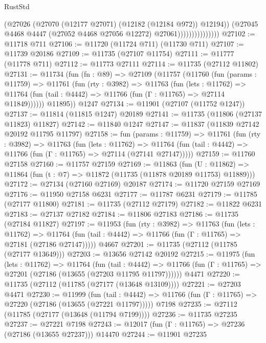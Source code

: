 \begin{lexlean}{RustStd}
\begin{coremodule}
                                (@27026 (@27070 (@12177 @27071) (@12182 (@12184 @972)) @12194))
                                (@27045
                                  @4468
                                  @4447
                                  (@27052 @4468 @27056 @12272)
                                  @27061)))))))))))))))
@27102 := @11718 @711
@27106 := @11720 (@11724 @711) (@11730 @711)
@27107 := @11739 @20186
@27109 := @11735 (@27107 @11754)
@27111 := @11777 (@11778 @711)
@27112 := @11773 @27111
@27114 := @11735 (@27112 @11802)
@27131 := @11734
    (fun (fn : @89) =>
    @27109
      (@11757
        (@11760
          (fun (params : @11759) =>
          @11761
            (fun (rty : @3982) =>
            @11763
              (fun (lets : @11762) =>
              @11764 (fun (tail : @4442) => @11766 (fun (Γ : @11765) => @27114 @11849))))))
        @11895))
    @1247
@27134 := @11901 (@27107 (@11752 @1247))
@27137 := @11814 (@11815 @1247) @20189
@27141 := @11735 (@11806 (@27137 @11823) @11827)
@27142 := @11840 @1247
@27147 := @11837 (@11839 @27142 @20192 @11795 @11797)
@27158 := fun (params : @11759) =>
  @11761
    (fun (rty : @3982) =>
    @11763
      (fun (lets : @11762) =>
      @11764 (fun (tail : @4442) => @11766 (fun (Γ : @11765) => @27114 (@27141 @27147)))))
@27159 := @11760 @27158
@27160 := @11757 @27159
@27169 := @11863
    (fun (U : @11862) => @11864 (fun (t : @7) => @11872 (@11735 (@11878 @20189 @11753) @11889)))
@27172 := @27134 (@27160 @27169) @20187
@27174 := @11720 @27159 @27169
@27176 := @11950 @27158 @6231
@27177 := @11787 @6231
@27179 := @11785 (@27177 @11800)
@27181 := @11735 (@27112 @27179)
@27182 := @11822 @6231
@27183 := @27137 @27182
@27184 := @11806 @27183
@27186 := @11735 (@27184 @11827)
@27197 := @11953
    (fun (rty : @3982) =>
    @11763
      (fun (lets : @11762) =>
      @11764 (fun (tail : @4442) => @11766 (fun (Γ : @11765) => @27181 (@27186 @27147)))))
    @4667
@27201 := @11735 (@27112 (@11785 (@27177 @13649)))
@27203 := @13656 @27142 @20192
@27215 := @11975
    (fun (lets : @11762) =>
    @11764
      (fun (tail : @4442) =>
      @11766 (fun (Γ : @11765) => @27201 (@27186 (@13655 (@27203 @11795 @11797))))))
    @4471
@27220 := @11735 (@27112 (@11785 (@27177 (@13648 @13109))))
@27221 := @27203 @4471
@27230 := @11999
    (fun (tail : @4442) => @11766 (fun (Γ : @11765) => @27220 (@27186 (@13655 (@27221 @11797)))))
    @7198
@27235 := @27112 (@11785 (@27177 (@13648 (@11794 @7199))))
@27236 := @11735 @27235
@27237 := @27221 @7198
@27243 := @12017 (fun (Γ : @11765) => @27236 (@27186 (@13655 @27237))) @14470
@27244 := @11901 @27235

\end{coremodule}
\end{lexlean}
